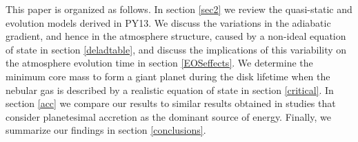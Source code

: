 \documentclass[apj]{emulateapj}
\begin{document}



This paper is organized as follows. In section \ref{sec2} we review the quasi-static and evolution models derived in PY13. We discuss the variations in the adiabatic gradient, and hence in the atmosphere structure, caused by a non-ideal equation of state in section \ref{deladtable}, and discuss the implications of this variability on the atmosphere evolution time in section \ref{EOSeffects}. We determine the minimum core mass to form a giant planet during the disk lifetime when the nebular gas is described by a realistic equation of state in section \ref{critical}. In section \ref{acc} we compare our results to similar results obtained in studies that consider planetesimal accretion as the dominant source of energy. Finally, we summarize our findings in section \ref{conclusions}.
\end{document}
